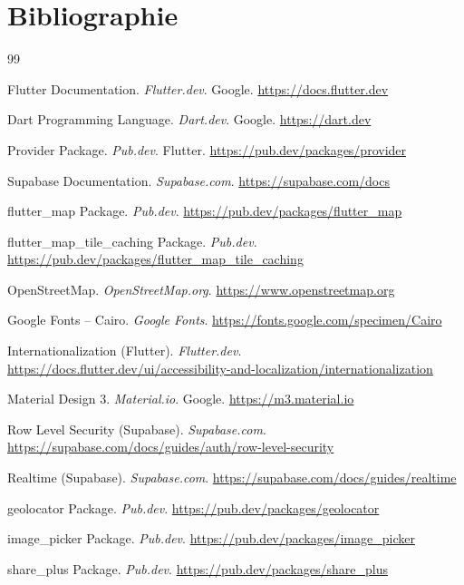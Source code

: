 \documentclass[12pt,a4paper]{report}
\begin{document}
\chapter*{Bibliographie}
\begin{thebibliography}{99}

Flutter Documentation. \textit{Flutter.dev}. Google.
\url{https://docs.flutter.dev}

Dart Programming Language. \textit{Dart.dev}. Google.
\url{https://dart.dev}

Provider Package. \textit{Pub.dev}. Flutter.
\url{https://pub.dev/packages/provider}

Supabase Documentation. \textit{Supabase.com}.
\url{https://supabase.com/docs}

flutter\_map Package. \textit{Pub.dev}.
\url{https://pub.dev/packages/flutter_map}

flutter\_map\_tile\_caching Package. \textit{Pub.dev}.
\url{https://pub.dev/packages/flutter_map_tile_caching}

OpenStreetMap. \textit{OpenStreetMap.org}.
\url{https://www.openstreetmap.org}

Google Fonts -- Cairo. \textit{Google Fonts}.
\url{https://fonts.google.com/specimen/Cairo}

Internationalization (Flutter). \textit{Flutter.dev}.
\url{https://docs.flutter.dev/ui/accessibility-and-localization/internationalization}

Material Design 3. \textit{Material.io}. Google.
\url{https://m3.material.io}

Row Level Security (Supabase). \textit{Supabase.com}.
\url{https://supabase.com/docs/guides/auth/row-level-security}

Realtime (Supabase). \textit{Supabase.com}.
\url{https://supabase.com/docs/guides/realtime}

geolocator Package. \textit{Pub.dev}.
\url{https://pub.dev/packages/geolocator}

image\_picker Package. \textit{Pub.dev}.
\url{https://pub.dev/packages/image_picker}

share\_plus Package. \textit{Pub.dev}.
\url{https://pub.dev/packages/share_plus}


\end{thebibliography}
\end{document}
